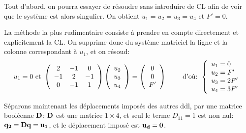 \medskip
Tout d'abord, on pourra essayer de résoudre sans introduire de CL afin de voir que le système est alors
singulier. On obtient $u_1=u_2=u_3=u_4$ et $F'=0$.



\medskip
La méthode la plus rudimentaire consiste à prendre en compte directement et explicitement la CL.
On supprime donc du système matriciel la ligne et la colonne correspondant à $u_1$, et on résoud:
\begin{equation}\label{Eq-Base}
u_1=0 \text{ et }
\left( \begin{array}{ccc} 2 & -1 & 0 \\ -1 & 2 & -1\\ 0&-1&1 \end{array}\right)
\left(  \begin{array}{c} u_2\\u_3\\u_4 \end{array}\right)
=
\left(  \begin{array}{c} 0\\0\\F' \end{array}\right)
\qquad \text{ d'où: } 
\left\{\begin{array}{l} u_1=0 \\ u_2=F' \\ u_3=2F' \\ u_4=3F' \end{array}\right.
\end{equation}



\medskip
Séparons maintenant les déplacements imposés des autres ddl, par une matrice booléenne $\mathbf{D}$:
$\mathbf{D}$ est une matrice $1\times 4$, et seul le terme $D_{11}=1$ est non nul: $\mathbf{q_2}=\mathbf{D}\mathbf{q}=\mathbf{u_1}$,
et le déplacement imposé est $\mathbf{u_d}=\mathbf{0}$.

